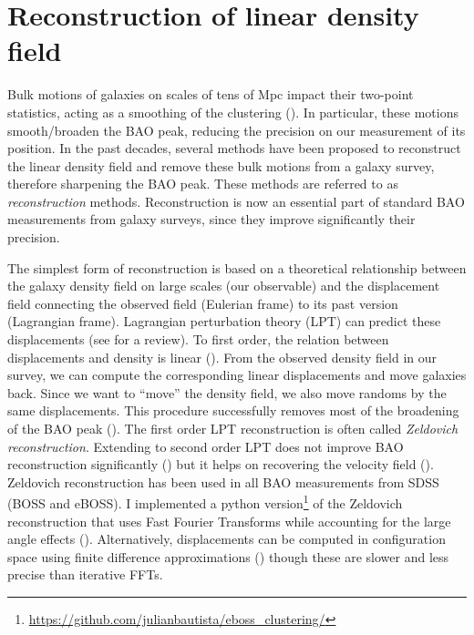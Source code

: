 \section{Reconstruction of linear density field} 
\label{galaxies:reconstruction}

Bulk motions of galaxies on scales of tens of Mpc impact their two-point statistics, 
acting as a smoothing of the clustering (\cite{eisensteinRobustnessAcousticScale2007}).  
In particular, these motions smooth/broaden the BAO peak, 
reducing the precision on our measurement of its position. 
In the past decades, several methods have been proposed to reconstruct
the linear density field and remove these bulk motions from a galaxy survey,
therefore sharpening the BAO peak.
These methods are referred to as \emph{reconstruction} methods. 
Reconstruction is now an essential part of standard BAO measurements from galaxy surveys,
since they improve significantly their precision. 

The simplest form of reconstruction is based on a theoretical relationship between 
the galaxy density field on large scales (our observable) and the displacement field connecting 
the observed field (Eulerian frame) to its past version (Lagrangian frame). 
Lagrangian perturbation theory (LPT) can predict these displacements 
(see \cite{bernardeauLargeScaleStructureUniverse2002} for a review). 
To first order, the relation between displacements and density is linear 
(\cite{zeldovichGravitationalInstabilityApproximate1970}). From the observed 
density field in our survey, we can compute the corresponding linear displacements
and move galaxies back. Since we want to ``move'' the density field, we also move randoms 
by the same displacements. 
This procedure successfully removes most of the broadening of the BAO peak
(\cite{nusserTracingLargeScaleFluctuations1992, eisensteinImprovingCosmologicalDistance2007}).
The first order LPT reconstruction is often called \emph{Zeldovich reconstruction}. 
Extending to second order LPT does not improve BAO reconstruction significantly 
(\cite{seoHighprecisionPredictionsAcoustic2010}) but it helps on recovering the 
velocity field (\cite{kitauraEstimatingCosmicVelocity2012}).
Zeldovich reconstruction has been used in all BAO measurements from SDSS (BOSS and eBOSS).
I implemented a python version\footnote{\url{https://github.com/julianbautista/eboss_clustering/}} of 
the Zeldovich reconstruction that uses Fast Fourier Transforms while accounting for the 
large angle effects 
(\cite{burdenEfficientReconstructionLinear2014, burdenReconstructionFourierSpace2015}). 
Alternatively, displacements can be computed 
in configuration space using finite difference approximations (\cite{padmanabhanCentDistance352012})
though these are slower and less precise than iterative FFTs. 

